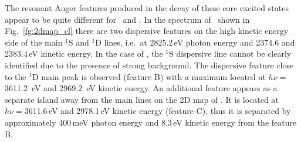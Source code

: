 The resonant Auger features produced in the decay of these core excited states appear to be quite different for \cli~and \ki. In the spectrum of \cli~shown in Fig.\ \ref{fg:2dmap_cl} there are two dispersive features on the high kinetic energy side of the main $^1$S and $^1$D lines, i.e.\ at 2825.2\,eV photon energy and 2374.6 and 2383.4\,eV kinetic energy. In the case of \ki, the $^1$S dispersive line cannot be clearly identified due to the presence of strong background. The dispersive feature close to the $^1$D main peak is observed (feature B) with a maximum located at $h\nu = $3611.2 \,eV and 2969.2 \,eV kinetic energy. An additional feature appears as a separate island away from the main lines on the 2D map of \ki. It is located at $h\nu = $3611.6\,eV and 2978.1\,eV kinetic energy (feature C), thus it is separated by approximately 400\,meV photon energy and 8.3\,eV kinetic energy from the feature B. 







